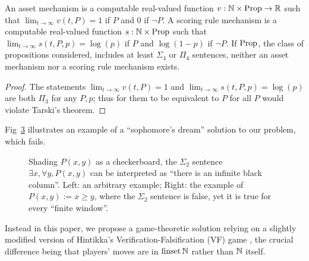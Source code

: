 \documentclass{article}
\begin{document}
\begin{lemma}
    An asset mechanism is a computable real-valued function $v:\mathbb{N}\times\operatorname{Prop}\to\mathbb{R}$ such that $\lim_{t\to\infty}v(t,P)=1$ if $P$ and $0$ if $\lnot P$. A scoring rule mechanism is a computable real-valued function $s:\mathbb{N}\times\operatorname{Prop}$ such that $\lim_{t\to\infty}s(t,P,p)=\log(p)$ if $P$ and $\log(1-p)$ if $\lnot P$. If $\operatorname{Prop}$, the class of propositions considered, includes at least $\Sigma_4$ or $\Pi_4$ sentences, neither an asset mechanism nor a scoring rule mechanism exists. 
    \label{lem:nogo}
\end{lemma}
\begin{proof}
    The statements $\lim_{t\to\infty}v(t,P)=1$ and $\lim_{t\to\infty}s(t,P,p)=\log(p)$ are both $\Pi_3$ for any $P, p$; thus for them to be equivalent to $P$ for all $P$ would violate Tarski's theorem.
\end{proof}

Fig~\ref{fig:checkerboard} illustrates an example of a ``sophomore's dream'' solution to our problem, which fails.

\begin{figure}
    \centering
    \begin{subfigure}{0.45\textwidth}
        \centering
        
        \label{fig:checkerboard1}
    \end{subfigure}\hfill%
    \begin{subfigure}{0.45\textwidth}
        \centering
        
        \label{fig:checkerboard2}
    \end{subfigure}
    \caption{Shading $P(x,y)$ as a checkerboard, the $\Sigma_2$ sentence $\exists x,\forall y, P(x,y)$ can be interpreted as ``there is an infinite black column''. Left: an arbitrary example; Right: the example of $P(x,y):=x\ge y$, where the $\Sigma_2$ sentence is false, yet it is true for every ``finite window''.}
    \label{fig:checkerboard}
\end{figure}

Instead in this paper, we propose a game-theoretic solution relying on a slightly modified version of Hintikka's Verification-Falsification (VF) game \cite{hintikkaGameTheoreticSemantics1997}, the crucial difference being that players' moves are in $\operatorname{finset}{\mathbb{N}}$ rather than $\mathbb{N}$ itself.
\end{document}
